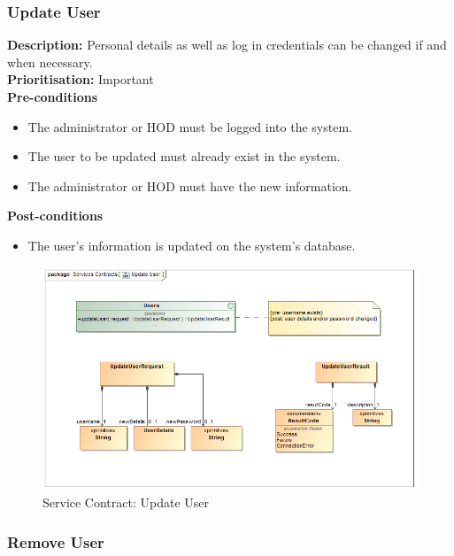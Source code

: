 \documentclass[a4paper]{article}
\begin{document}
    
    \pagebreak
    \subsubsection{Update User}
   
    \textbf{Description:} Personal details as well as log in credentials can be changed if and when necessary.\\
     \textbf{Prioritisation:} Important\\
     
    \textbf{Pre-conditions}
     \begin{itemize}
        \item The administrator or HOD must be logged into the system.
        \item The user to be updated must already exist in the system.
        \item The administrator or HOD must have the new information.
   \end{itemize}
    
    \textbf{Post-conditions}
    \begin{itemize}
        \item The user's information is updated on the system's database.
    \end{itemize}
    
        	\begin{figure}[H]
        		\centering
        		\includegraphics[width=\textwidth]{5.1.3.Update.User.Services.Contract.png}
        		\caption{Service Contract: Update User}
        	\end{figure}
    \pagebreak
    \subsubsection{Remove User}
    
\end{document}
